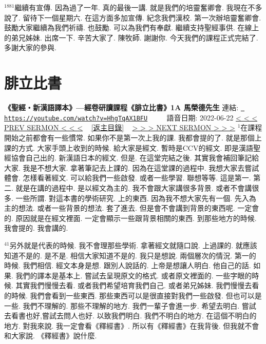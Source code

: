 \documentclass{book}
\begin{document}
$^{1881}$繼續有宣傳.
因為過了一年.
真的最後一講.
就是我們的培靈奮卿會.
我現在不多說了.
留待下一個星期六.
在這方面多加宣傳.
紀念我們漢校.
第一次辦培靈奮卿會.
鼓勵大家繼續為我們祈禱.
也鼓勵.
可以為我們有奉獻.
繼續支持聖經事供.
在線上的弟兄姊妹.
出席一下.
辛苦大家了.
陳牧師.
謝謝你.
今天我們的課程正式完結了.
多謝大家的參與.
\newpage



\section{腓立比書}
\label{sec:HhgTqAX1BFU}
\textbf{《聖經‧新漢語譯本》—經卷研讀課程《腓立比書》1A 馬榮德先生}
\newline
\newline
連結: \href{https://youtube.com/watch?v=HhgTqAX1BFU}{\texttt{ https://youtube.com/watch?v=HhgTqAX1BFU}} ~~~~ 語音日期: 2022-06-22 
\newline
\newline
\hyperref[sec:y7RfxilxFdE]{\small{< < < PREV SERMON < < <}}
~
\hyperref[sec:index]{\small{[返主目錄]}}
~
\hyperref[sec:io2zo_oCeFk]{\small{> > > NEXT SERMON > > >}}
\newline
\newline
$^{1}$在課程開始之前都會有一些慣常.
如果你不是第一次上我的課.
我都會提的了.
就是那個上課的方式.
大家手頭上收到的時候.
給大家是經文.
暫時是CCV的經文.
即是漢語聖經協會自己出的.
新漢語日本的經文.
但是.
在這堂完結之後.
其實我會補回筆記給大家.
我是不想大家.
拿著筆記去上課的.
因為在這堂課的過程中.
我想大家去嘗試體會.
怎樣看著經文.
可以給我們一些啟發.
或者一些學習.
聯想等等.
這是第一.
第二.
就是在講的過程中.
是以經文為主的.
我不會跟大家講很多背景.
或者不會講很多.
一些所謂.
對這本書的學術研究.
上的東西.
因為我不想大家先有一個.
先入為主的想法.
或者一些背景的想法.
套了進去.
但是會不會講到背景的東西呢.
一定會的.
原因就是在經文裡面.
一定會顯示一些跟背景相關的東西.
到那些地方的時候.
我會提的.
我會講的.

$^{41}$另外就是代表的時候.
我不會理那些學術.
拿著經文就隨口說.
上過課的.
就應該知道不是的.
是不是.
相信大家知道不是的.
我只是想說.
兩個層次的情況.
第一的時候.
我們相信.
經文本身是想.
跟別人說話的.
上帝是想讓人明白.
他自己的話.
如果.
我們的譯本是基本上.
嘗試去呈現原文的格式.
或者原文裡面的.
一些字眼的時候.
其實我們慢慢去看.
或者我們希望培育我們自己.
或者弟兄姊妹.
我們慢慢去看的時候.
我們會看到一些東西.
那些東西可以是很直接對我們一些啟發.
但也可以是一些.
我們不理解的.
那些不理解的地方.
我們一輩子會進一步.
希望去明白.
嘗試去看書也好,嘗試去問人也好.
以致我們明白.
我們不明白的地方.
在這個不明白的地方.
對我來說.
我一定會看《釋經書》.
所以有《釋經書》在我背後.
但我就不會和大家說.
《釋經書》說什麼.
\end{document}
